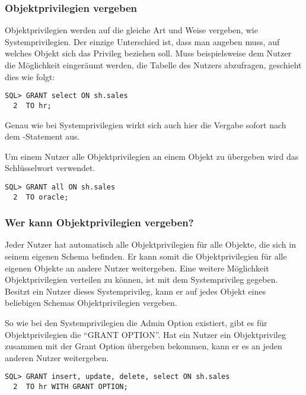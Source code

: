         \subsubsection{Objektprivilegien vergeben}
          Objektprivilegien werden auf die gleiche Art und Weise vergeben, wie Systemprivilegien. Der einzige Unterschied ist, dass man angeben muss, auf welches Objekt sich das Privileg beziehen soll. Muss beispielsweise dem Nutzer  die M\"oglichkeit einger\"aumt werden, die Tabelle  des Nutzers  abzufragen, geschieht dies wie folgt:
          \begin{lstlisting}[caption={Zuweisen eines Objekt
          Privilegs},label=admin235,language=oracle_sql] 
SQL> GRANT select ON sh.sales
  2  TO hr;
          \end{lstlisting}
          \begin{merke}
            Genau wie bei Systemprivilegien wirkt sich auch hier die Vergabe sofort nach dem -Statement aus.
          \end{merke}
          Um einem Nutzer alle Objektprivilegien an einem Objekt zu \"ubergeben wird das Schl\"us\-selwort  verwendet.
          \begin{lstlisting}[caption={Zuweisen aller
          Objektprivilegien},label=admin236,language=oracle_sql]
SQL> GRANT all ON sh.sales
  2  TO oracle;
          \end{lstlisting}
        \subsubsection{Wer kann Objektprivilegien vergeben?}
          Jeder Nutzer hat automatisch alle Objektprivilegien f\"ur alle Objekte, die sich in seinem eigenen Schema befinden. Er kann somit die Objektprivilegien f\"ur alle eigenen Objekte an andere Nutzer weitergeben. Eine weitere M\"oglichkeit Objektprivilegien verteilen zu k\"onnen, ist mit dem Systemprivileg  gegeben. Besitzt ein Nutzer dieses Systemprivileg, kann er auf jedes Objekt eines beliebigen Schemas Objektprivilegien vergeben.

          So wie bei den Systemprivilegien die Admin Option existiert, gibt es
          f\"ur Objektprivilegien die \enquote{GRANT OPTION}. Hat ein Nutzer ein
          Objektprivileg zusammen mit der Grant Option \"ubergeben bekommen,
          kann er es an jeden anderen Nutzer weitergeben.
          \begin{lstlisting}[caption={Zuweisen von Objektprivilegien mit GRANT OPTION},label=admin237,language=oracle_sql]
SQL> GRANT insert, update, delete, select ON sh.sales
  2  TO hr WITH GRANT OPTION;
          \end{lstlisting}
